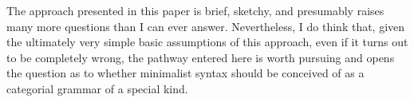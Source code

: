 \documentclass[output=paper
,modfonts
,nonflat]{langsci/langscibook}
\begin{document}
The approach presented in this paper is brief, sketchy, and presumably raises many more questions than I can ever answer. Nevertheless, I do think that, given the ultimately very simple basic assumptions of this approach, even if it turns out to be completely wrong, the pathway entered here is worth pursuing and opens the question as to whether minimalist syntax should be conceived of as a categorial grammar of a special kind. 




\sloppy
\printbibliography[heading=subbibliography,notkeyword=this]
\end{document}

